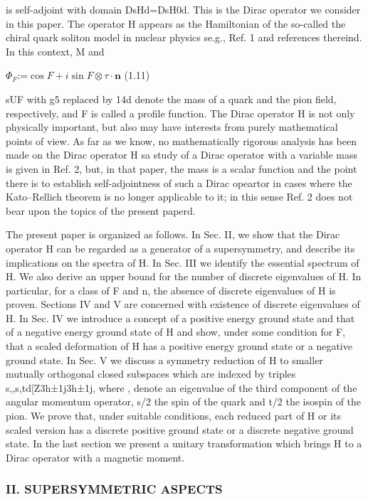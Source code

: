 \documentclass{article}
\begin{document}
is self-adjoint with domain DsHd=DsH0d. This is the Dirac operator we consider in this paper. The operator H appears as the Hamiltonian of the so-called the chiral quark soliton model in nuclear physics se.g., Ref. 1 and references thereind. In this context, M and

$\Phi_{F}$:=$\cos F+i\sin F\otimes\tau\cdot\mathbf{n}$ (1.11)

sUF with g5 replaced by 14d denote the mass of a quark and the pion field, respectively, and F is called a profile function. The Dirac operator H is not only physically important, but also may have interests from purely mathematical points of view. As far as we know, no mathematically rigorous analysis has been made on the Dirac operator H sa study of a Dirac operator with a variable mass is given in Ref. 2, but, in that paper, the mass is a scalar function and the point there is to establish self-adjointness of such a Dirac opeartor in cases where the Kato–Rellich theorem is no longer applicable to it; in this sense Ref. 2 does not bear upon the topics of the present paperd.

The present paper is organized as follows. In Sec. II, we show that the Dirac operator H can be regarded as a generator of a supersymmetry, and describe its implications on the spectra of H. In Sec. III we identify the essential spectrum of H. We also derive an upper bound for the number of discrete eigenvalues of H. In particular, for a class of F and n, the absence of discrete eigenvalues of H is proven. Sections IV and V are concerned with existence of discrete eigenvalues of H. In Sec. IV we introduce a concept of a positive energy ground state and that of a negative energy ground state of H and show, under some condition for F, that a scaled deformation of H has a positive energy ground state or a negative ground state. In Sec. V we discuss a symmetry reduction of H to smaller mutually orthogonal closed subspaces which are indexed by triples s,,s,td[Z3h±1j3h±1j, where , denote an eigenvalue of the third component of the angular momentum operator, s/2 the spin of the quark and t/2 the isospin of the pion. We prove that, under suitable conditions, each reduced part of H or its scaled version has a discrete positive ground state or a discrete negative ground state. In the last section we present a unitary transformation which brings H to a Dirac operator with a magnetic moment.

\subsubsection{\textbf{II. SUPERSYMMETRIC ASPECTS}}
\end{document}
